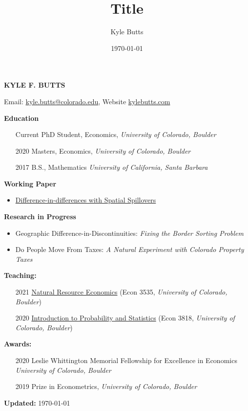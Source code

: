 \documentclass[11pt]{article}
\title{Title}
\date{\today}
\author{Kyle Butts}
\begin{document}
\begin{center}
    {\fontsize{18}{16} \normalfont \bf \color{navyblue} KYLE F. BUTTS}
    
    \vspace{5mm}
    Email: \href{mailto:kyle.butts@colorado.edu}{kyle.butts@colorado.edu}, Website \href{https://www.kylebutts.com}{kylebutts.com}
\end{center}

\vspace{10mm}
{\bf \color{navyblue} Education}
\begin{itemize}[leftmargin=1in]
    \item[Current] PhD Student, Economics, {\it University of Colorado, Boulder}
    \item[2020] Masters, Economics, {\it University of Colorado, Boulder}
    \item[2017] B.S., Mathematics {\it University of California, Santa Barbara}
\end{itemize}

{\bf \color{navyblue} Working Paper}

\begin{itemize}[leftmargin=1in]
    \item \href{https://kylebutts.com/files/Spillover.pdf}{Difference-in-differences with Spatial Spillovers}
\end{itemize}

{\bf \color{navyblue} Research in Progress}
\begin{itemize}[leftmargin=1in]
    \item Geographic Difference-in-Discontinuities: \textit{Fixing the Border Sorting Problem}
    
    \item Do People Move From Taxes: \textit{A Natural Experiment with Colorado Property Taxes}
\end{itemize}





\vspace{5mm}
{\bf \color{navyblue} Teaching:}
\begin{itemize}[leftmargin=1in]
    \item[2021] \href{https://github.com/kylebutts/ECON3535_S2021}{Natural Resource Economics} (Econ 3535, {\it University of Colorado, Boulder})
    \item[2020] \href{https://github.com/kylebutts/ECON3818_F2020}{Introduction to Probability and Statistics} (Econ 3818, {\it University of Colorado, Boulder})
\end{itemize}


\vspace{5mm}
{\bf \color{navyblue} Awards:}
\begin{itemize}[leftmargin=1in]
    \item[2020] Leslie Whittington Memorial Fellowship for Excellence in Economics {\it University of Colorado, Boulder}
    \item[2019] Prize in Econometrics, {\it University of Colorado, Boulder}
\end{itemize}

\vspace{10mm}
{\bf \color{navyblue} Updated:} \today
\end{document}
